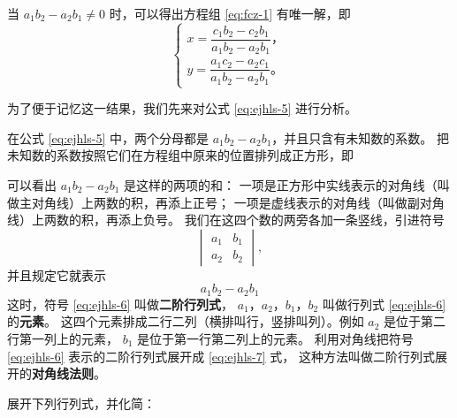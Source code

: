 当 $a_1b_2 - a_2b_1 \neq 0$ 时，可以得出方程组 \eqref{eq:fcz-1} 有唯一解，即
\begin{equation}
    \begin{cases}
        x = \dfrac{c_1b_2 - c_2b_1}{a_1b_2 - a_2b_1} \text{，} \\[1.5em]
        y = \dfrac{a_1c_2 - a_2c_1}{a_1b_2 - a_2b_1} \text{。} \label{eq:ejhls-5}
    \end{cases}
\end{equation}

为了便于记忆这一结果，我们先来对公式 \eqref{eq:ejhls-5} 进行分析。

在公式 \eqref{eq:ejhls-5} 中，两个分母都是 $a_1b_2 - a_2b_1$，并且只含有未知数的系数。
把未知数的系数按照它们在方程组中原来的位置排列成正方形，即
\begin{figure}[H]
    \centering
    
\end{figure}
可以看出 $a_1b_2 - a_2b_1$ 是这样的两项的和：
一项是正方形中实线表示的对角线（叫做主对角线）上两数的积，再添上正号；
一项是虚线表示的对角线（叫做副对角线）上两数的积，再添上负号。
我们在这四个数的两旁各加一条竖线，引进符号
\begin{equation}
    \begin{vmatrix}
        a_1 & b_1 \\
        a_2 & b_2
    \end{vmatrix}, \label{eq:ejhls-6}
\end{equation}
并且规定它就表示
\begin{equation}
    a_1b_2 - a_2b_1 \label{eq:ejhls-7}
\end{equation}
这时，符号 \eqref{eq:ejhls-6} 叫做\textbf{二阶行列式}，
$a_1$，$a_2$，$b_1$，$b_2$ 叫做行列式 \eqref{eq:ejhls-6} 的\textbf{元素}。
这四个元素排成二行二列（横排叫行，竖排叫列）。例如 $a_2$ 是位于第二行第一列上的元素，
$b_1$ 是位于第一行第二列上的元素。
利用对角线把符号 \eqref{eq:ejhls-6} 表示的二阶行列式展开成 \eqref{eq:ejhls-7} 式，
这种方法叫做二阶行列式展开的\textbf{对角线法则}。

\liti 展开下列行列式，并化简：

